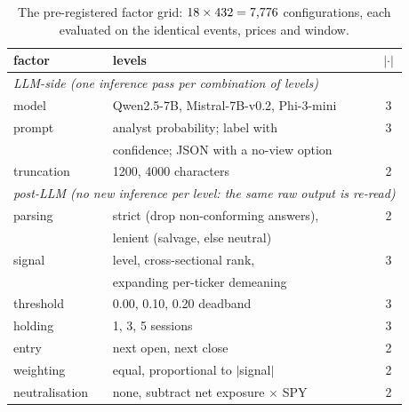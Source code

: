 \documentclass[sigconf]{acmart}
\begin{document}
\begin{table}[t]
\centering
\caption{The pre-registered factor grid: $18{} \times 432{} = \mbox{\mdseries7,776{}}$
configurations, each evaluated on the identical events, prices and window.}
\label{tab:grid}
\small
\begin{tabular}{llc}
\toprule
factor & levels & $\vert\cdot\vert$ \\
\midrule
\multicolumn{3}{l}{\textit{LLM-side (one inference pass per combination of levels)}}\\
model & Qwen2.5-7B, Mistral-7B-v0.2, Phi-3-mini & 3 \\
prompt & analyst probability; label with & 3 \\
       & confidence; JSON with a no-view option & \\
truncation & 1200, 4000 characters & 2 \\
\midrule
\multicolumn{3}{l}{\textit{post-LLM (no new inference per level: the same raw output is re-read)}}\\
parsing & strict (drop non-conforming answers), & 2 \\
        & lenient (salvage, else neutral) & \\
signal & level, cross-sectional rank, & 3 \\
       & expanding per-ticker demeaning & \\
threshold & 0.00, 0.10, 0.20 deadband & 3 \\
holding & 1, 3, 5 sessions & 3 \\
entry & next open, next close & 2 \\
weighting & equal, proportional to $\vert$signal$\vert$ & 2 \\
neutralisation & none, subtract net exposure $\times$ SPY & 2 \\
\bottomrule
\end{tabular}
\end{table}

\begin{table}[t]
\centering
\caption{Percentage of filings for which the model answered in the format the prompt asked for, so
that a strict parser accepts it. A cell at or near zero means that under a strict parser that
model-prompt combination has almost no tradable events. Whether it trades is therefore joint: the same
output is usable under a lenient parser and unusable under a strict one.}
\label{tab:compliance}
\small

\end{table}
\end{document}
